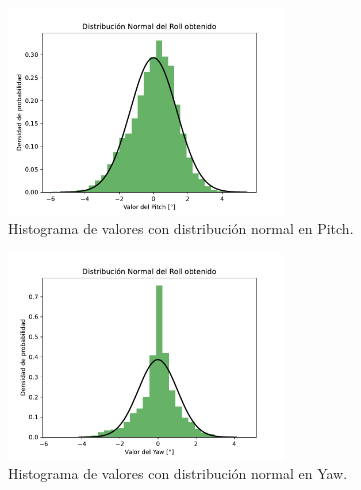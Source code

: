 \begin{figure}[H]
	\centering    
	\includegraphics[width=0.65\textwidth]{pitch_DNormal.pdf}
	\caption{Histograma de valores con distribución normal en Pitch.}
	\label{fig:pitch_DNormal}
\end{figure}	

\begin{figure}[H]
	\centering    
	\includegraphics[width=0.65\textwidth]{yaw_DNormal.pdf}
	\caption{Histograma de valores con distribución normal en Yaw.}
	\label{fig:yaw_DNormal}
\end{figure}	
